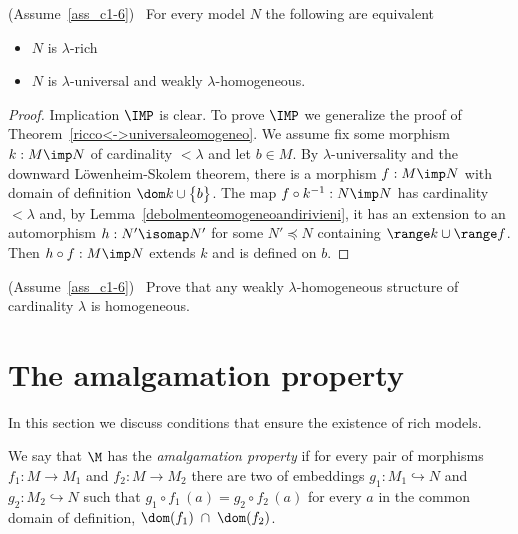 \begin{theorem}\label{ricco=universaledebolmenteomogeneo}
(Assume~\ref{ass_c1-6})  \  For every model $N$ the following are equivalent
\begin{itemize}
\item[1.] $N$ is $\lambda$-rich
\item[2.] $N$ is $\lambda$-universal and weakly $\lambda$-homogeneous.
\end{itemize}
\end{theorem}

\begin{proof} 
Implication $\IMP$ is clear.
To prove $\IMP$ we generalize the proof of Theorem~\ref{ricco<->universaleomogeneo}.
We assume  fix some morphism $k:M\imp N$ of cardinality $<\lambda$ and let $b\in M$.
By $\lambda$-universality and the downward L\"owenheim-Skolem theorem, there is a morphism $f:M\imp N$ with domain of definition $\dom k\cup\big\{b\big\}$.
The map $f\circ k^{-1}:N\imp N$ has cardinality $<\lambda$ and, by Lemma~\ref{debolmenteomogeneoandirivieni}, it has an extension to an automorphism $h:N'\isomap N'$ for some $N'\preceq N$ containing $\range k\cup\range f$.
Then $h\circ f:M\imp N$ extends $k$ and is defined on $b$.
\end{proof}


\begin{exercise}\label{omogeneo=debolmenteaomogeneo}
  (Assume~\ref{ass_c1-6}) \ Prove that any weakly $\lambda$-ho\-mo\-ge\-ne\-ous structure of cardinality $\lambda$ is homogeneous.
  \end{exercise}
  
\section{The amalgamation property}\label{amalgamation}

In this section we discuss conditions that ensure the existence of rich models.

We say that $\M$ has the \emph{amalgamation property\/} if for every pair of morphisms $f_1:M\to M_1$ and $f_2:M\to M_2$ there are two of embeddings $g_1:M_1\hookrightarrow N$ and $g_2:M_2\hookrightarrow N$ such that $g_1\circ f_1\, (a) = g_2\circ f_2\, (a)$ for every $a$ in the common domain of definition, $\dom (f_1)\; \cap\; \dom (f_2)$.


